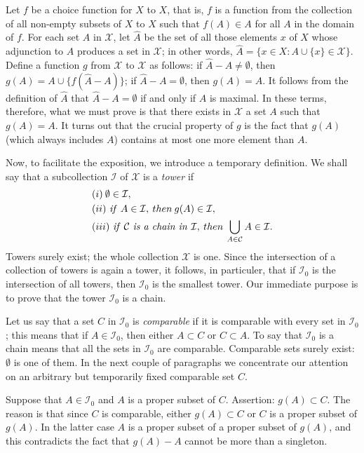 Let $f$ be a choice function for $X$ to $X$, that is, $f$ is a function from the collection of all non-empty subsets of $X$ to $X$ such that $f(A) \in A$ for all $A$ in the domain of $f$. For each set $A$ in $\mathcal{X}$, let $\hat{A}$ be the set of all those elements $x$ of $X$ whose adjunction to $A$ produces a set in $\mathcal{X}$; in other words, $\hat{A} =\{ x \in X:A \cup \{ x \} \in \mathcal{X} \}$. Define a function $g$ from $\mathcal{X}$ to $\mathcal{X}$ as follows: if $\hat{A} - A \neq \emptyset $, then $g(A) = A \cup \{ f( \hat{A} - A) \}$; if $\hat{A} - A = \emptyset$, then $g(A) = A$. It follows from the definition of $\hat{A}$ that $\hat{A} - A = \emptyset$ if and only if $A$ is maximal. In these terms, therefore, what we must prove is that there exists in $\mathcal{X}$ a set $A$ such that $g(A) = A$. It turns out that the crucial property of $g$ is the fact that $g(A)$ (which always includes $A$) contains at most one more element than $A$.

Now, to facilitate the exposition, we introduce a temporary definition. We shall say that a subcollection $\mathcal{I}$ of $\mathcal{X}$ is a \textit{tower} if 
\begin{align*} 
&(i) \: \emptyset \in \mathcal{I} , \\
&(ii) \text{ \textit{if} } A \in \mathcal{I}, \: then \: g(A) \in \mathcal{I} ,\\
&(iii) \text{ \textit{if} } \mathcal{C} \text{ \textit{is a chain in} } \mathcal{I}, \: then \: \bigcup_{A \in \mathcal{C}} A \in \mathcal{I}. 
\end{align*}
Towers surely exist; the whole collection $\mathcal{X}$ is one. Since the intersection of a collection of towers is again a tower, it follows, in particuler, that if $\mathcal{I}_{0}$ is the intersection of all towers, then $\mathcal{I}_{0}$ is the smallest tower. Our immediate purpose is to prove that the tower $\mathcal{I}_{0}$ is a chain. 

Let us say that a set $C$ in $\mathcal{I}_{0}$ is \textit{comparable} if it is comparable with every set in $\mathcal{I}_{0}$; this means that if $A \in \mathcal{I}_{0}$, then either $A \subset C$ or $C \subset A$. To say that $\mathcal{I}_{0}$ is a chain means that all the sets in $\mathcal{I}_{0}$ are comparable. Comparable sets surely exist: $\emptyset$ is one of them. In the next couple of paragraphs we concentrate our attention on an arbitrary but temporarily fixed comparable set $C$. 

Suppose that $A \in \mathcal{I}_{0}$ and $A$ is a proper subset of $C$. Assertion: $g(A) \subset C$. The reason is that since $C$ is comparable, either $g(A) \subset C$ or $C$ is a proper subset of $g(A)$. In the latter case $A$ is a proper subset of a proper subset of $g(A)$, and this contradicts the fact that $g(A) - A$ cannot be more than a singleton. 

